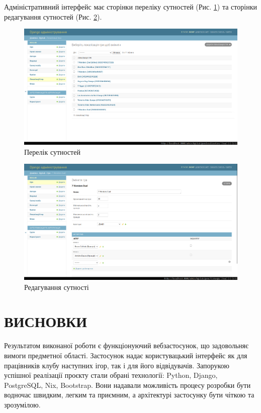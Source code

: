 \documentclass[a4paper, 14pt]{extarticle}
\begin{document}
  Адміністративний інтерфейс має сторінки переліку сутностей (Рис. \ref{plp}) та
  сторінки редагування сутностей (Рис. \ref{pdp}).

  \begin{figure}[h]
    \includegraphics[width=\textwidth]{figures/plp.png}
    \centering
    \caption{Перелік сутностей}
    \label{plp}
  \end{figure}

  \begin{figure}[h]
    \includegraphics[width=\textwidth]{figures/pdp.png}
    \centering
    \caption{Редагування сутності}
    \label{pdp}
  \end{figure}

  \clearpage
  \section{ВИСНОВКИ}
  Результатом виконаної роботи є функціонуючий вебзастосунок, що задовольняє вимоги предметної
  області. Застосунок надає користувацький інтерфейс як для працівників клубу наступних
  ігор, так і для його відвідувачів. Запорукою успішної реалізації проєкту стали обрані
  технології: Python, Django, PostgreSQL, Nix, Bootstrap. Вони надавали можливість
  процесу розробки бути водночас швидким, легким та приємним, а архітектурі застосунку
  бути чіткою та зрозумілою.
\end{document}
